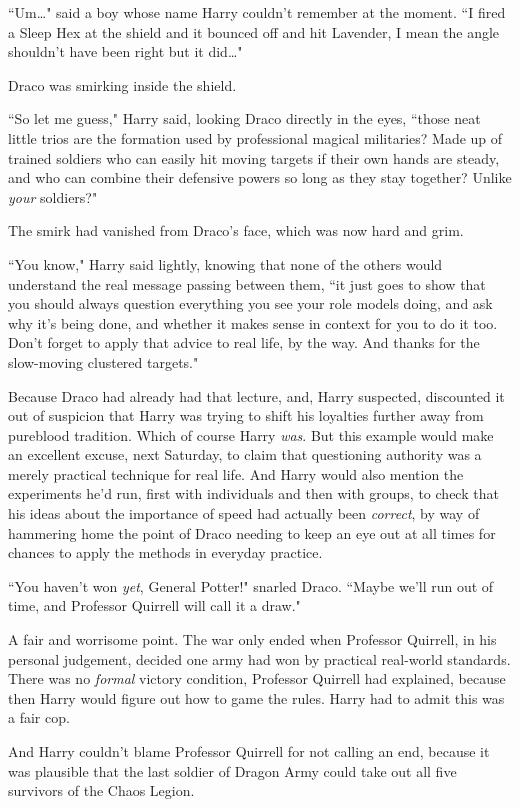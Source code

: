 ``Um{\ldots}" said a boy whose name Harry couldn't remember at the moment. ``I fired a Sleep Hex at the shield and it bounced off and hit Lavender, I mean the angle shouldn't have been right but it did{\ldots}"

Draco was smirking inside the shield.

``So let me guess," Harry said, looking Draco directly in the eyes, ``those neat little trios are the formation used by professional magical militaries? Made up of trained soldiers who can easily hit moving targets if their own hands are steady, and who can combine their defensive powers so long as they stay together? Unlike \emph{your} soldiers?"

The smirk had vanished from Draco's face, which was now hard and grim.

``You know," Harry said lightly, knowing that none of the others would understand the real message passing between them, ``it just goes to show that you should always question everything you see your role models doing, and ask why it's being done, and whether it makes sense in context for you to do it too. Don't forget to apply that advice to real life, by the way. And thanks for the slow-moving clustered targets."

Because Draco had already had that lecture, and, Harry suspected, discounted it out of suspicion that Harry was trying to shift his loyalties further away from pureblood tradition. Which of course Harry \emph{was}. But this example would make an excellent excuse, next Saturday, to claim that questioning authority was a merely practical technique for real life. And Harry would also mention the experiments he'd run, first with individuals and then with groups, to check that his ideas about the importance of speed had actually been \emph{correct}, by way of hammering home the point of Draco needing to keep an eye out at all times for chances to apply the methods in everyday practice.

``You haven't won \emph{yet}, General Potter!" snarled Draco. ``Maybe we'll run out of time, and Professor Quirrell will call it a draw."

A fair and worrisome point. The war only ended when Professor Quirrell, in his personal judgement, decided one army had won by practical real-world standards. There was no \emph{formal} victory condition, Professor Quirrell had explained, because then Harry would figure out how to game the rules. Harry had to admit this was a fair cop.

And Harry couldn't blame Professor Quirrell for not calling an end, because it was plausible that the last soldier of Dragon Army could take out all five survivors of the Chaos Legion.

